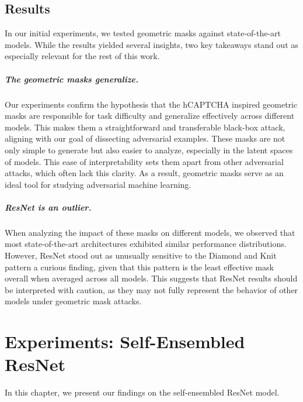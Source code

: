 \documentclass[a4paper, oneside]{discothesis}
\begin{document}
\section{Results}

In our initial experiments, we tested geometric masks against state-of-the-art models. While the results yielded several insights, two key takeaways stand out as especially relevant for the rest of this work.

\paragraph{The geometric masks generalize.}

Our experiments confirm the hypothesis that the hCAPTCHA inspired geometric masks are responsible for task difficulty and generalize effectively across different models. This makes them a straightforward and transferable black-box attack, aligning with our goal of dissecting adversarial examples. These masks are not only simple to generate but also easier to analyze, especially in the latent spaces of models. This ease of interpretability sets them apart from other adversarial attacks, which often lack this clarity. As a result, geometric masks serve as an ideal tool for studying adversarial machine learning.

\paragraph{ResNet is an outlier.}

When analyzing the impact of these masks on different models, we observed that most state-of-the-art architectures exhibited similar performance distributions. However, ResNet stood out as unusually sensitive to the Diamond and Knit pattern \textendash{} a curious finding, given that this pattern is the least effective mask overall when averaged across all models. This suggests that ResNet results should be interpreted with caution, as they may not fully represent the behavior of other models under geometric mask attacks.

% 
% 

\chapter{Experiments: Self-Ensembled ResNet}

In this chapter, we present our findings on the self-ensembled ResNet model.
\end{document}
